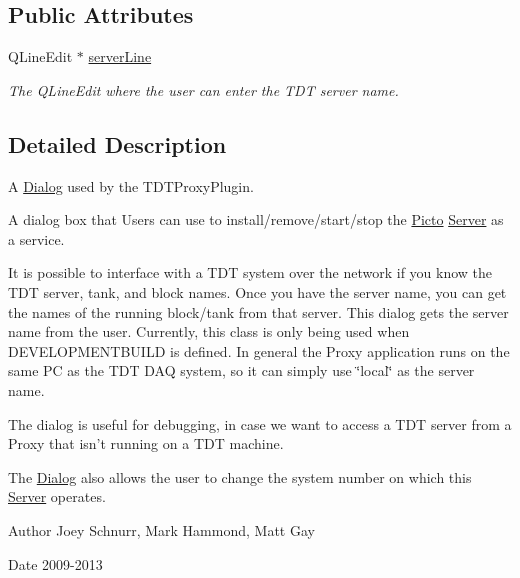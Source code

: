 \subsection*{Public Attributes}
\begin{DoxyCompactItemize}
\item 
\hypertarget{class_dialog_adfdff8046ab5a78512915d76d897f49e}{Q\-Line\-Edit $\ast$ \hyperlink{class_dialog_adfdff8046ab5a78512915d76d897f49e}{server\-Line}}\label{class_dialog_adfdff8046ab5a78512915d76d897f49e}

\begin{DoxyCompactList}\small\item\em The Q\-Line\-Edit where the user can enter the T\-D\-T server name. \end{DoxyCompactList}\end{DoxyCompactItemize}


\subsection{Detailed Description}
A \hyperlink{class_dialog}{Dialog} used by the T\-D\-T\-Proxy\-Plugin. 

A dialog box that Users can use to install/remove/start/stop the \hyperlink{namespace_picto}{Picto} \hyperlink{class_server}{Server} as a service.

It is possible to interface with a T\-D\-T system over the network if you know the T\-D\-T server, tank, and block names. Once you have the server name, you can get the names of the running block/tank from that server. This dialog gets the server name from the user. Currently, this class is only being used when D\-E\-V\-E\-L\-O\-P\-M\-E\-N\-T\-B\-U\-I\-L\-D is defined. In general the Proxy application runs on the same P\-C as the T\-D\-T D\-A\-Q system, so it can simply use \char`\"{}local\char`\"{} as the server name.

The dialog is useful for debugging, in case we want to access a T\-D\-T server from a Proxy that isn't running on a T\-D\-T machine.

The \hyperlink{class_dialog}{Dialog} also allows the user to change the system number on which this \hyperlink{class_server}{Server} operates. \begin{DoxyAuthor}{Author}
Joey Schnurr, Mark Hammond, Matt Gay 
\end{DoxyAuthor}
\begin{DoxyDate}{Date}
2009-\/2013 
\end{DoxyDate}


